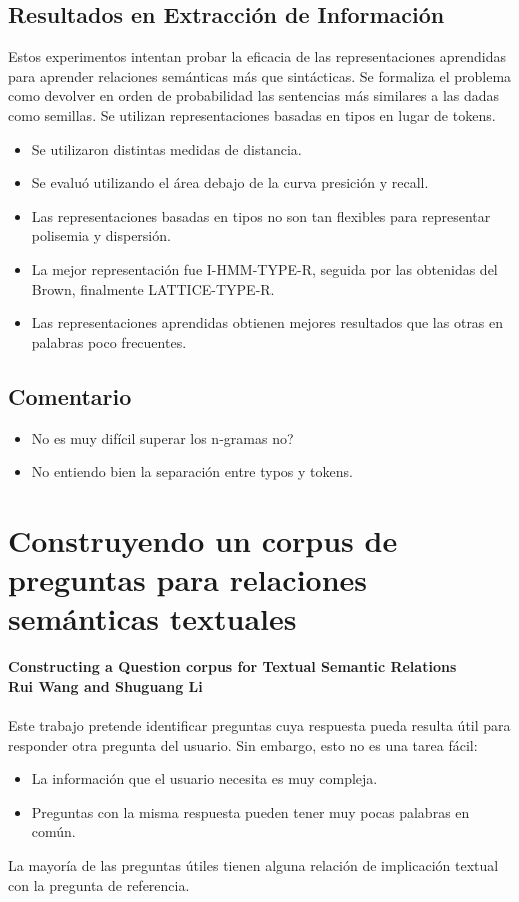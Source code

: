 \documentclass[11pt,spanish]{article}
\begin{document}
\subsection{Resultados en Extracción de Información}
Estos experimentos intentan probar la eficacia de las representaciones aprendidas para aprender relaciones semánticas más que sintácticas.
Se formaliza el problema como devolver en orden de probabilidad las sentencias más similares a las dadas como semillas. Se utilizan representaciones basadas en tipos en lugar de tokens.
\begin{itemize}
    \item Se utilizaron distintas medidas de distancia.
    \item Se evaluó utilizando el área debajo de la curva presición y recall.
    \item Las representaciones basadas en tipos no son tan flexibles para representar polisemia y dispersión.
    \item La mejor representación fue I-HMM-TYPE-R, seguida por las obtenidas del Brown, finalmente LATTICE-TYPE-R.
    \item Las representaciones aprendidas obtienen mejores resultados que las otras en palabras poco frecuentes.
\end{itemize}

\subsection{Comentario}
\begin{itemize}
    \item No es muy difícil superar los n-gramas no?
    \item No entiendo bien la separación entre typos y tokens.
\end{itemize}


\section{Construyendo un corpus de preguntas para relaciones semánticas textuales}

\textbf{Constructing a Question corpus for Textual Semantic Relations}\\
\textbf{Rui Wang and Shuguang Li}\\\\
Este trabajo pretende identificar preguntas cuya respuesta pueda resulta útil para responder otra pregunta del usuario. Sin embargo, esto no es una tarea fácil:
\begin{itemize}
    \item La información que el usuario necesita es muy compleja.
    \item Preguntas con la misma respuesta pueden tener muy pocas palabras en común.
\end{itemize}
La mayoría de las preguntas útiles tienen alguna relación de implicación textual con la pregunta de referencia.
\end{document}
